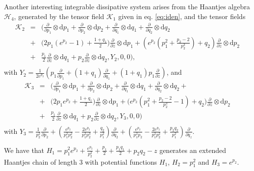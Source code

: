 \documentclass[10pt]{amsart}
\numberwithin{equation}{section}
\newcommand{\bea}{\begin{eqnarray}}
\newcommand{\eea}{\end{eqnarray}}
\newcommand{\nn}{\nonumber}
\newcommand{\rd}{\mathrm{d}}
\theoremstyle{definition}
\begin{document}
\subsubsection{} Another interesting integrable dissipative system arises from the Haantjes algebra $\mathscr{H}_4$, generated by the tensor field $\mathcal{K}_1$ given in eq. \eqref{eq:iden}, and the tensor fields
\bea \nn
\mathcal{K}_2&=& \Bigg(\frac{\partial}{\partial p_1}\otimes \rd p_1+ \frac{\partial}{\partial p_2}\otimes \rd p_2+\frac{\partial}{\partial q_1}\otimes \rd q_1+\frac{\partial}{\partial q_2}\otimes \rd q_2 \\ \nn 
&+&   \Big(2p_1(e^{p_2}-1) + \frac{1+q_1}{2}\Big)  \frac{\partial}{\partial z}\otimes \rd p_1+ \left(e^{p_2}\left(p_1^2 + \frac{p_2-2}{p_2^3}\right) + q_2\right) \frac{\partial}{\partial z}\otimes \rd p_2 \\ \nn
&+& \frac{p_1}{2} \frac{\partial}{\partial z}\otimes \rd q_1 +  p_2 \frac{\partial}{\partial z} \otimes \rd q_2, Y_2,0,0 \Bigg), \\
\eea
with $Y_{2}=\frac{1}{2e^{p_{2}}}\left(p_{1}\frac{\partial}{\partial p_{1}}+(1+q_{1})\frac{\partial}{\partial q_{1}}+(1+q_{1})p_{1}\frac{\partial}{\partial z}\right)$, and
\bea
\nn \mathcal{K}_3&=&  \Bigg(\frac{\partial}{\partial p_1}\otimes \rd p_1 +  \frac{\partial}{\partial p_2}\otimes \rd p_2 + \frac{\partial}{\partial q_1}\otimes \rd q_1 + \frac{\partial}{\partial q_2}\otimes \rd q_2 + \\ \nn  &+& \Big(2p_1 e^{p_2} + \frac{1+q_1}{2}\Big) \frac{\partial}{\partial z}\otimes \rd p_1 +\Big(e^{p_2}\left(p_1^2 + \frac{p_2-2}{p_2^3}-1\right) + q_2\Big) \frac{\partial}{\partial z}\otimes \rd p_2 \\ \nn &+&  \frac{p_1}{2} \frac{\partial}{\partial z }\otimes \rd q_1 + p_2 \frac{\partial}{\partial z} \otimes \rd q_2, Y_3,0,0 \Bigg) \\
\eea
with $Y_{3}=\frac{1}{p_{2}^{2}}\frac{\partial}{\partial p_{2}}+\left(\frac{e^{p_{2}}}{p_{1}^{2}p_{2}^{2}}-\frac{2e^{p_{2}}}{p_{1}^{2}p_{2}^{3}}+\frac{q_{2}}{p_{1}^{2}}\right)\frac{\partial}{\partial q_{2}}+\left(\frac{e^{p_{2}}}{p_{1}^{2}p_{2}}-\frac{2e^{p_{2}}}{p_{1}^{2}p_{2}^{2}}+\frac{p_{2}q_{2}}{p_{1}^{2}}\right)\frac{\partial}{\partial q_{z}}$.
\vspace{2mm}

We have that $H_1= p_1^2 e^{p_2}+ \frac{e^{p_2}}{p_2^2}+ \frac{p_1}{2} +\frac{p_1 q_1}{2}+ p_2 q_2  -z$ generates an extended Haantjes chain of length $3$ with potential functions $H_{1}$, $H_2=p_1^2$ and $H_3=e^{p_2}.$
\end{document}
